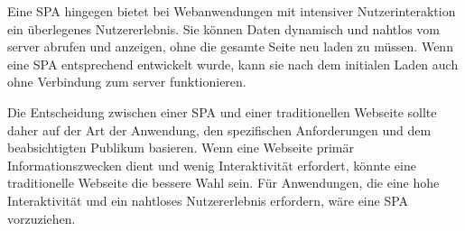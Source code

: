 Eine \ac{SPA} hingegen bietet bei Webanwendungen mit intensiver Nutzerinteraktion ein überlegenes Nutzererlebnis.
Sie können Daten dynamisch und nahtlos vom \gls{server} abrufen und anzeigen, ohne die gesamte Seite neu laden zu müssen.
Wenn eine \ac{SPA} entsprechend entwickelt wurde, kann sie nach dem initialen Laden auch ohne Verbindung zum \gls{server} funktionieren.

Die Entscheidung zwischen einer \ac{SPA} und einer traditionellen Webseite sollte daher auf der Art der Anwendung, den spezifischen Anforderungen und dem beabsichtigten Publikum basieren.
Wenn eine Webseite primär Informationszwecken dient und wenig Interaktivität erfordert, könnte eine traditionelle Webseite die bessere Wahl sein.
Für Anwendungen, die eine hohe Interaktivität und ein nahtloses Nutzererlebnis erfordern, wäre eine \ac{SPA} vorzuziehen.


